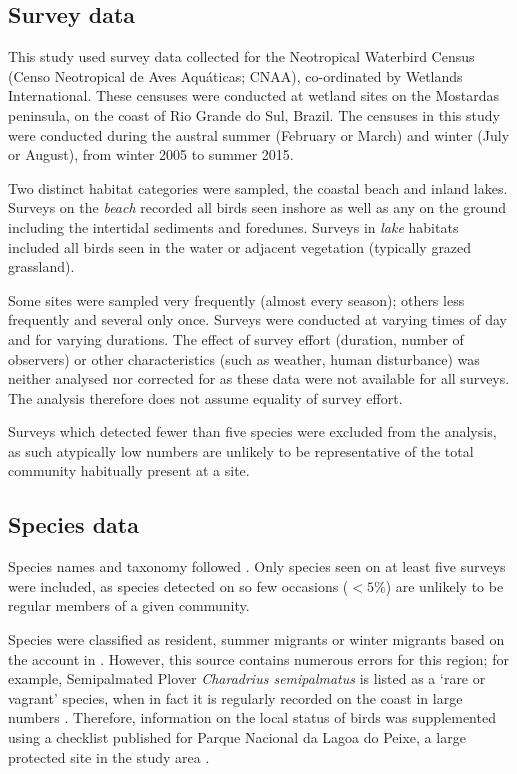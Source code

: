 \documentclass[12pt,a4paper]{book}
\begin{document}
\subsection{Survey data}

This study used survey data collected for the Neotropical Waterbird Census (Censo Neotropical de Aves Aqu\'{a}ticas; CNAA), co-ordinated by Wetlands International. These censuses were conducted at wetland sites on the Mostardas peninsula, on the coast of Rio Grande do Sul, Brazil. The censuses in this study were conducted during the austral summer (February or March) and winter (July or August), from winter 2005 to summer 2015. 

Two distinct habitat categories were sampled, the coastal beach and inland lakes. Surveys on the \textit{beach} recorded all birds seen inshore as well as any on the ground including the intertidal sediments and foredunes. Surveys in \textit{lake} habitats included all birds seen in the water or adjacent vegetation (typically grazed grassland).

Some sites were sampled very frequently (almost every season); others less frequently and several only once. Surveys were conducted at varying times of day and for varying durations. The effect of survey effort (duration, number of observers) or other characteristics (such as weather, human disturbance) was neither analysed nor corrected for as these data were not available for all surveys. The analysis therefore does not assume equality of survey effort. 

Surveys which detected fewer than five species were excluded from the analysis, as such atypically low numbers are unlikely to be representative of the total community habitually present at a site. 

\subsection{Species data}

Species names and taxonomy followed \citet{vanPerlo2009}. Only species seen on at least five surveys were included, as species detected on so few occasions ($<5\%$) are unlikely to be regular members of a given community. 

Species were classified as resident, summer migrants or winter migrants based on the account in \citet{vanPerlo2009}. However, this source contains numerous errors for this region; for example, Semipalmated Plover \textit{Charadrius semipalmatus} is listed as a `rare or vagrant' species, when in fact it is regularly recorded on the coast in large numbers \citep[e.g.][and pers. obs]{Sanabria2011, Scherer2012}. Therefore, information on the local status of birds was supplemented using a checklist published for Parque Nacional da Lagoa do Peixe, a large protected site in the study area \citep{Nascimento1995}.
\end{document}
